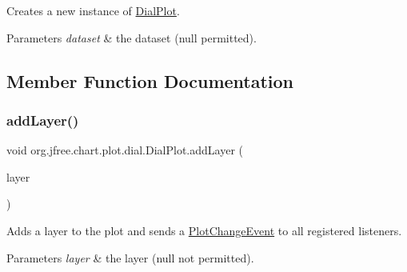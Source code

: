 Creates a new instance of {\ttfamily \mbox{\hyperlink{classorg_1_1jfree_1_1chart_1_1plot_1_1dial_1_1_dial_plot}{Dial\+Plot}}}.


\begin{DoxyParams}{Parameters}
{\em dataset} & the dataset ({\ttfamily null} permitted). \\
\hline
\end{DoxyParams}


\subsection{Member Function Documentation}
\mbox{\label{classorg_1_1jfree_1_1chart_1_1plot_1_1dial_1_1_dial_plot_aba3ac5d84201304097d0c8042aee2d20}} 
\subsubsection{\texorpdfstring{add\+Layer()}{addLayer()}}
{\footnotesize\ttfamily void org.\+jfree.\+chart.\+plot.\+dial.\+Dial\+Plot.\+add\+Layer (\begin{DoxyParamCaption}\item[{\mbox{\hyperlink{interfaceorg_1_1jfree_1_1chart_1_1plot_1_1dial_1_1_dial_layer}{Dial\+Layer}}}]{layer }\end{DoxyParamCaption})}

Adds a layer to the plot and sends a \mbox{\hyperlink{}{Plot\+Change\+Event}} to all registered listeners.


\begin{DoxyParams}{Parameters}
{\em layer} & the layer ({\ttfamily null} not permitted). \\
\hline
\end{DoxyParams}
\mbox{\label{classorg_1_1jfree_1_1chart_1_1plot_1_1dial_1_1_dial_plot_a72b0a538b7ef14a09469463e300e2c13}} 
